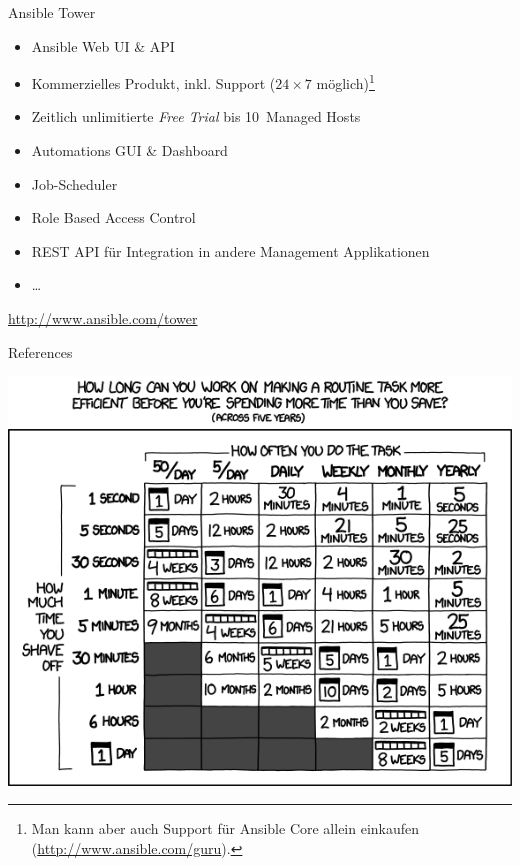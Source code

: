 \begin{frame}{Ansible Tower}
  \begin{itemize}
    \item Ansible Web UI \& API

    \item Kommerzielles Produkt, inkl. Support ($24\times 7$
    möglich)\footnote{Man kann aber auch Support für Ansible Core allein
    einkaufen (\url{http://www.ansible.com/guru}).}
    
    \item Zeitlich unlimitierte \emph{Free Trial} bis 10~Managed Hosts
    \item Automations GUI \& Dashboard
    \item Job-Scheduler
    \item Role Based Access Control
    \item REST API für Integration in andere Management Applikationen
    \item\dots
  \end{itemize}

  \centerline{\url{http://www.ansible.com/tower}}

\end{frame}


\begin{frame}[allowframebreaks,t]{References}
  \scriptsize
  \nocite{*}

  
  


\end{frame}


\begin{frame}[plain]
  \vspace*{3ex}
  \centerline{\includegraphics[height=0.9\textheight]{files/xkcd1205_is_it_worth_the_time.png}}
\end{frame}

